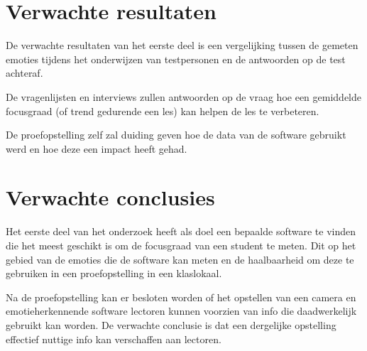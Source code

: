 \section{Verwachte resultaten}
\label{sec:verwachte_resultaten}



De verwachte resultaten van het eerste deel is een vergelijking tussen de gemeten emoties tijdens het onderwijzen van testpersonen en de antwoorden op de test achteraf. 

De vragenlijsten en interviews zullen antwoorden op de vraag hoe een gemiddelde focusgraad (of trend gedurende een les) kan helpen de les te verbeteren.

De proefopstelling zelf zal duiding geven hoe de data van de software gebruikt werd en hoe deze een impact heeft gehad. 


\section{Verwachte conclusies}
\label{sec:verwachte_conclusies}


Het eerste deel van het onderzoek heeft als doel een bepaalde software te vinden die het meest geschikt is om de focusgraad van een student te meten. Dit op het gebied van de emoties die de software kan meten en de haalbaarheid om deze te gebruiken in een proefopstelling in een klaslokaal.

Na de proefopstelling kan er besloten worden of het opstellen van een camera en emotieherkennende software lectoren kunnen voorzien van info die daadwerkelijk gebruikt kan worden. De verwachte conclusie is dat een dergelijke opstelling effectief nuttige info kan verschaffen aan lectoren. \textsl{}